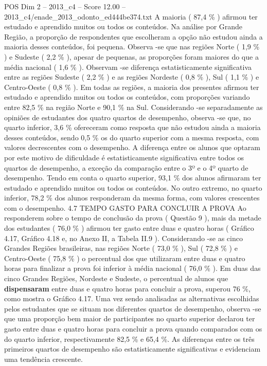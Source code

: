 \begin{textsample}{POS Dim 2 – 2013\_c4 – Score 12.00 – 2013\_c4/enade\_2013\_odonto\_ed444be374.txt}
A maioria ( 87,4 \% ) afirmou ter estudado e aprendido muitos ou todos os conteúdos.
Na análise por Grande Região, a proporção de respondentes que escolheram a opção não estudou ainda a maioria desses conteúdos, foi pequena.
Observa -se que nas regiões Norte ( 1,9 \% ) e Sudeste ( 2,2 \% ), apesar de pequenas, as proporções foram maiores do que a média nacional ( 1,6 \% ).
Observam -se diferença estatisticamente significativa entre as regiões Sudeste ( 2,2 \% ) e as regiões Nordeste ( 0,8 \% ), Sul ( 1,1 \% ) e Centro-Oeste ( 0,8 \% ).
Em todas as regiões, a maioria dos presentes afirmou ter estudado e aprendido muitos ou todos os conteúdos, com proporções variando entre 82,5 \% na região Norte e 90,1 \% na Sul.
Considerando -se separadamente as opiniões de estudantes dos quatro quartos de desempenho, observa -se que, no quarto inferior, 3,6 \% ofereceram como resposta que não estudou ainda a maioria desses conteúdos, sendo 0,5 \% os do quarto superior com a mesma resposta, com valores decrescentes com o desempenho.
A diferença entre os alunos que optaram por este motivo de dificuldade é estatisticamente significativa entre todos os quartos de desempenho, a exceção da comparação entre o 3º e o 4º quarto de desempenho.
Tendo em conta o quarto superior, 93,1 \% dos alunos afirmaram ter estudado e aprendido muitos ou todos os conteúdos.
No outro extremo, no quarto inferior, 78,2 \% dos alunos responderam da mesma forma, com valores crescentes com o desempenho. 4.7 TEMPO GASTO PARA CONCLUIR A PROVA Ao responderem sobre o tempo de conclusão da prova ( Questão 9 ), mais da metade dos estudantes ( 76,0 \% ) afirmou ter gasto entre duas e quatro horas ( Gráfico 4.17, Gráfico 4.18 e, no Anexo II, a Tabela II.9 ).
Considerando -se as cinco Grandes Regiões brasileiras, nas regiões Norte ( 73,0 \% ), Sul ( 72,8 \% ) e Centro-Oeste ( 75,8 \% ) o percentual dos que utilizaram entre duas e quatro horas para finalizar a prova foi inferior à média nacional ( 76,0 \% ).
Em duas das cinco Grandes Regiões, Nordeste e Sudeste, o percentual de alunos que \textbf{dispensaram} entre duas e quatro horas para concluir a prova, superou 76 \%, como mostra o Gráfico 4.17.
Uma vez sendo analisadas as alternativas escolhidas pelos estudantes que se situam nos diferentes quartos de desempenho, observa -se que uma proporção bem maior de participantes no quarto superior declarou ter gasto entre duas e quatro horas para concluir a prova quando comparados com os do quarto inferior, respectivamente 82,5 \% e 65,4 \%.
As diferenças entre os três primeiros quartos de desempenho são estatisticamente significativas e evidenciam uma tendência crescente.

\end{textsample}

